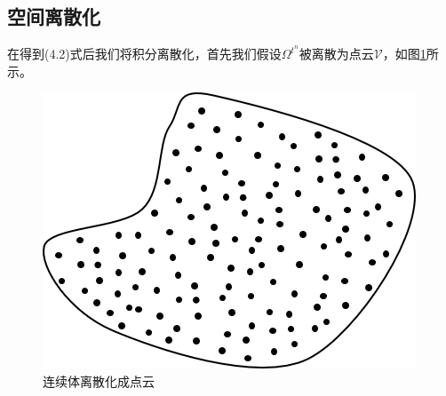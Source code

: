 \subsection{空间离散化}
在得到(4.2)式后我们将积分离散化，首先我们假设$\Omega^{t^n}$被离散为点云$\mathcal{V}$，如图\ref{fig: discretise continuum}所示。
\begin{figure}[htbp]
    \centering
    \includegraphics[scale=0.8]{./images/image11.png}
    \caption[连续体离散化]{连续体离散化成点云}
    \label{fig: discretise continuum}
\end{figure}

